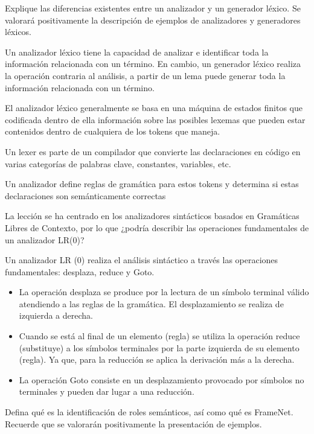 \documentclass[11pt]{exam}
\begin{document}
\begin{questions}
\question Explique las diferencias existentes entre un analizador y un generador léxico. Se valorará positivamente la descripción de ejemplos de analizadores y generadores léxicos. 

Un analizador léxico tiene la capacidad de analizar e identificar toda la información relacionada con un término. En cambio, un generador léxico realiza la operación contraria al análisis, a partir de un lema puede generar toda la información relacionada con un término.

El analizador léxico generalmente se basa en una máquina de estados finitos que codificada dentro de ella información sobre las posibles lexemas que pueden estar contenidos dentro de cualquiera de los tokens que maneja.

Un lexer es parte de un compilador que convierte las declaraciones en código en varias categorías de palabras clave, constantes, variables, etc.

Un analizador define reglas de gramática para estos tokens y determina si estas declaraciones son semánticamente correctas

\question La lección se ha centrado en los analizadores sintácticos basados en Gramáticas Libres de Contexto, por lo que ¿podría describir las operaciones fundamentales de un analizador LR(0)?

Un analizador LR (0) realiza el análisis sintáctico a través las operaciones fundamentales: desplaza, reduce y Goto. 

\begin{itemize}
	\item La operación desplaza se produce por la lectura de un símbolo terminal válido atendiendo a las reglas de la gramática. El desplazamiento se realiza de izquierda a derecha.
	\item Cuando se está al final de un elemento (regla) se utiliza la operación reduce (substituye) a los símbolos terminales por la parte izquierda de su elemento (regla). Ya que, para la reducción se aplica la derivación más a la derecha.
	\item La operación Goto consiste en un desplazamiento provocado por símbolos no terminales y pueden dar lugar a una	reducción.
\end{itemize}

\question Defina qué es la identificación de roles semánticos, así como qué es FrameNet. Recuerde que se valorarán positivamente la presentación de ejemplos.

\end{questions}
\end{document}
